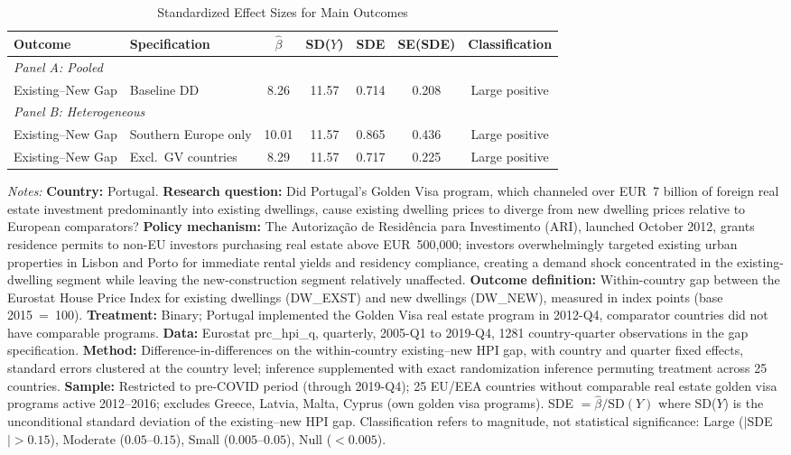 \begin{table}[H]
\centering
\caption{Standardized Effect Sizes for Main Outcomes}
\label{tab:sde}
\begin{threeparttable}
\small
\begin{tabular}{llccccc}
\toprule
Outcome & Specification & $\hat{\beta}$ & SD($Y$) & SDE & SE(SDE) & Classification \\
\midrule
\multicolumn{7}{l}{\textit{Panel A: Pooled}} \\
Existing--New Gap & Baseline DD & 8.26 & 11.57 & 0.714 & 0.208 & Large positive \\
\midrule
\multicolumn{7}{l}{\textit{Panel B: Heterogeneous}} \\
Existing--New Gap & Southern Europe only & 10.01 & 11.57 & 0.865 & 0.436 & Large positive \\
Existing--New Gap & Excl.\ GV countries & 8.29 & 11.57 & 0.717 & 0.225 & Large positive \\
\bottomrule
\end{tabular}
\begin{tablenotes}[flushleft]
\footnotesize\sloppy
\item \textit{Notes:} \textbf{Country:} Portugal. \textbf{Research question:} Did Portugal's Golden Visa program, which channeled over EUR~7 billion of foreign real estate investment predominantly into existing dwellings, cause existing dwelling prices to diverge from new dwelling prices relative to European comparators? \textbf{Policy mechanism:} The Autoriza\c{c}\~{a}o de Resid\^{e}ncia para Investimento (ARI), launched October 2012, grants residence permits to non-EU investors purchasing real estate above EUR~500,000; investors overwhelmingly targeted existing urban properties in Lisbon and Porto for immediate rental yields and residency compliance, creating a demand shock concentrated in the existing-dwelling segment while leaving the new-construction segment relatively unaffected. \textbf{Outcome definition:} Within-country gap between the Eurostat House Price Index for existing dwellings (DW\_EXST) and new dwellings (DW\_NEW), measured in index points (base 2015~=~100). \textbf{Treatment:} Binary; Portugal implemented the Golden Visa real estate program in 2012-Q4, comparator countries did not have comparable programs. \textbf{Data:} Eurostat prc\_hpi\_q, quarterly, 2005-Q1 to 2019-Q4, 1281 country-quarter observations in the gap specification. \textbf{Method:} Difference-in-differences on the within-country existing--new HPI gap, with country and quarter fixed effects, standard errors clustered at the country level; inference supplemented with exact randomization inference permuting treatment across 25 countries. \textbf{Sample:} Restricted to pre-COVID period (through 2019-Q4); 25 EU/EEA countries without comparable real estate golden visa programs active 2012--2016; excludes Greece, Latvia, Malta, Cyprus (own golden visa programs). SDE $= \hat{\beta} / \text{SD}(Y)$ where SD($Y$) is the unconditional standard deviation of the existing--new HPI gap. Classification refers to magnitude, not statistical significance: Large ($|$SDE$| > 0.15$), Moderate ($0.05$--$0.15$), Small ($0.005$--$0.05$), Null ($< 0.005$).

\end{tablenotes}
\end{threeparttable}
\end{table}
